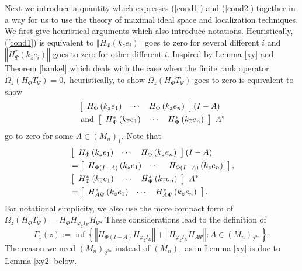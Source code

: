 \documentclass{article}%
\begin{document}
Next we introduce a quantity which expresses (\ref{cond1}) and (\ref{cond2})
together in a way for us to use the theory of maximal ideal space and
localization techniques. We first give heuristical arguments which also
introduce notations. Heuristically, (\ref{cond1}) is equivalent to $\left\Vert
H_{\Phi}\left(  k_{z}e_{i}\right)  \right\Vert $ goes to zero for several
different $i$ and $\left\Vert H_{\Psi}^{\ast}\left(  k_{\overline{z}}%
e_{i}\right)  \right\Vert $ goes to zero for other different $i.$ Inspired by
Lemma \ref{xy} and Theorem \ref{hankel} which deals with the case when the
finite rank operator $\Omega_{z}(H_{\Phi}T_{\Psi})=0,$ heuristically, to show
$\Omega_{z}(H_{\Phi}T_{\Psi})$ goes to zero is equivalent to show%
\begin{align*}
&  \left[
\begin{array}
[c]{ccc}%
H_{\Phi}\left(  k_{z}e_{1}\right)  & \cdots & H_{\Phi}\left(  k_{z}%
e_{n}\right)
\end{array}
\right]  (I-A)\\
&  \text{ and }\left[
\begin{array}
[c]{ccc}%
H_{\Psi}^{\ast}\left(  k_{\overline{z}}e_{1}\right)  & \cdots & H_{\Psi}%
^{\ast}\left(  k_{\overline{z}}e_{n}\right)
\end{array}
\right]  \text{ }A^{\ast}%
\end{align*}
go to zero for some $A\in\left(  M_{n}\right)  _{1}.$ Note that%
\begin{align}
&  \left[
\begin{array}
[c]{ccc}%
H_{\Phi}\left(  k_{z}e_{1}\right)  & \cdots & H_{\Phi}\left(  k_{z}%
e_{n}\right)
\end{array}
\right]  (I-A)\label{onema}\\
&  =\left[
\begin{array}
[c]{ccc}%
H_{\Phi(I-A)}\left(  k_{z}e_{1}\right)  & \cdots & H_{\Phi(I-A)}\left(
k_{z}e_{n}\right)
\end{array}
\right]  ,\nonumber\\
&  \left[
\begin{array}
[c]{ccc}%
H_{\Psi}^{\ast}\left(  k_{\overline{z}}e_{1}\right)  & \cdots & H_{\Psi}%
^{\ast}\left(  k_{\overline{z}}e_{n}\right)
\end{array}
\right]  \text{ }A^{\ast}\nonumber\\
&  =\left[
\begin{array}
[c]{ccc}%
H_{A\Psi}^{\ast}\left(  k_{\overline{z}}e_{1}\right)  & \cdots & H_{A\Psi
}^{\ast}\left(  k_{\overline{z}}e_{n}\right)
\end{array}
\right]  .\nonumber
\end{align}
For notational simplicity, we also use the more compact form of $\Omega
_{z}(H_{\Phi}T_{\Psi})=H_{\Phi}H_{\overline{\varphi_{\overline{z}}}I_{E}%
}H_{\Psi}.$ These considerations lead to the definition of%
\[
\Gamma_{1}(z):=\inf\left\{  \left\Vert H_{\Phi(I-A)}H_{\overline
{\varphi_{\overline{z}}}I_{E}}\right\Vert +\left\Vert H_{\overline
{\varphi_{\overline{z}}}I_{E}}H_{A\Psi}\right\Vert :A\in\left(  M_{n}\right)
_{2^{2n}}\right\}  .
\]
The reason we need $\left(  M_{n}\right)  _{2^{2n}}$ instead of $\left(
M_{n}\right)  _{1}$ as in Lemma \ref{xy} is due to Lemma \ref{xy2} below.
\end{document}
